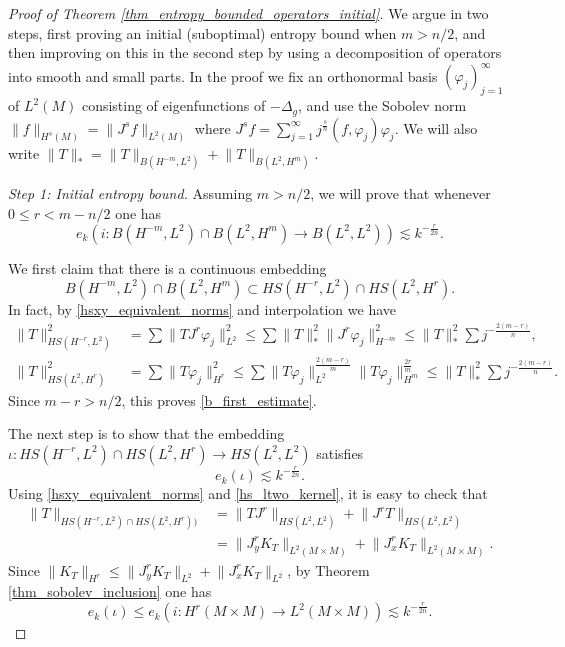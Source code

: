 \documentclass[10pt,a4paper]{amsart}
\newcommand{\norm}[1]{\lVert #1 \rVert}         %
\renewcommand{\leq}{\leqslant}
\begin{document}
\begin{proof}[Proof of Theorem \ref{thm_entropy_bounded_operators_initial}]
We argue in two steps, first proving an initial (suboptimal) entropy bound when $m > n/2$, and then improving on this in the second step by using a decomposition of operators into smooth and small parts. In the proof we fix an orthonormal basis $(\varphi_j)_{j=1}^{\infty}$ of $L^2(M)$ consisting of eigenfunctions of $-\Delta_g$, and use the Sobolev norm $\norm{f}_{H^s(M)} = \norm{J^s f}_{L^2(M)}$ where $J^s f = \sum_{j=1}^{\infty} j^{\frac{s}{n}} (f, \varphi_j) \varphi_j$. We will also write $\norm{T}_* = \norm{T}_{B(H^{-m},L^2)} + \norm{T}_{B(L^2, H^m)}$.

\emph{Step 1: Initial entropy bound.}
Assuming $m > n/2$, we will prove that whenever $0 \leq r < m-n/2$ one has 
\begin{equation} \label{ek_initial_mntwo}
e_k(i: B(H^{-m}, L^2) \cap B(L^2, H^m) \to B(L^2, L^2)) \lesssim k^{-\frac{r}{2n}}.
\end{equation}

We first claim that there is a continuous embedding 
\begin{equation} \label{b_first_estimate}
B(H^{-m}, L^2) \cap B(L^2, H^m) \subset HS(H^{-r}, L^2) \cap HS(L^2, H^r).
\end{equation}
In fact, by \eqref{hsxy_equivalent_norms} and interpolation we have 
\begin{align*}
\norm{T}_{HS(H^{-r}, L^2)}^2 &= \sum \norm{T J^r \varphi_j}_{L^2}^2 \leq \sum \norm{T}_*^2 \norm{J^r \varphi_j}_{H^{-m}}^2 \leq \norm{T}_{*}^2 \sum j^{-\frac{2(m-r)}{n}}, \\
\norm{T}_{HS(L^2, H^r)}^2 &= \sum \norm{T \varphi_j}_{H^r}^2 \leq \sum \norm{T \varphi_j}_{L^2}^{\frac{2(m-r)}{m}} \norm{T \varphi_j}_{H^m}^{\frac{2r}{m}} \leq \norm{T}_{*}^2 \sum j^{-\frac{2(m-r)}{n}}.
\end{align*}
Since $m-r > n/2$, this proves \eqref{b_first_estimate}.

The next step is to show that the embedding $\iota: HS(H^{-r}, L^2) \cap HS(L^2, H^r) \rightarrow HS(L^2, L^2)$ satisfies 
\[
e_k(\iota)    \lesssim k^{-\frac{r}{2n} }  .
\]
Using \eqref{hsxy_equivalent_norms} and \eqref{hs_ltwo_kernel}, it is easy to check that
\begin{align*}
\norm{T}_{HS(H^{-r}, L^2) \cap HS(L^2, H^r))}
& =  \norm{ TJ^r }_{HS(L^2, L^2)} + \norm{J^{r} T }_{HS(L^2, L^2)} \\
&  = \norm{  J_y^r K_T }_{L^2(M \times M)} + \norm{J_x^{r}  K_T}_{L^2(M \times M)}.
\end{align*}
Since $\norm{K_T}_{H^{r}} \leq \norm{ J_y^{r} K_T}_{L^2}+\norm{ J_x^{r} K_T}_{L^2} $, by Theorem \ref{thm_sobolev_inclusion}
one has 
\[
e_k(\iota) \leq e_k(i: H^{r}(M \times M) \to L^2(M \times M)) \lesssim k^{-\frac{r}{2n}}.
\]


\end{proof}
\end{document}
